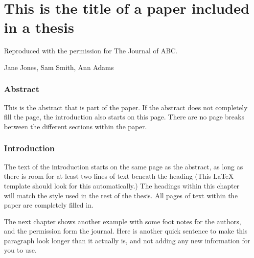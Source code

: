 \chapter{This is the title of a paper included in a thesis
\label{chap:P3}}

\begin{center}
    Reproduced with the permission for The Journal of ABC. 
    
    Jane Jones, Sam Smith, Ann Adams
\end{center}

\subsection{Abstract}

This is the abstract that is part of the paper. If the abstract does not completely fill the page, the introduction also starts on this page. There are no page breaks between the different sections within the paper.

\subsection{Introduction}

The text of the introduction starts on the same page as the abstract, as long as there is room for at least two lines of text beneath the heading (This \LaTeX{} template should look for this automatically.) The headings within this chapter will match the style used in the rest of the thesis. All pages of text within the paper are completely filled in.

The next chapter shows another example with some foot notes for the authors, and the permission form the journal. Here is another quick sentence to make this paragraph look longer than it actually is, and not adding any new information for you to use.
